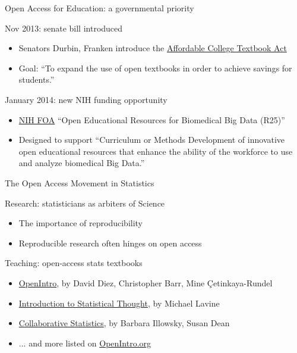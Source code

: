 
\begin{frame}{Open Access for Education: a governmental priority}

\begin{block}{Nov 2013: senate bill introduced}
\begin{itemize}
\item Senators Durbin, Franken introduce the \href{http://thomas.loc.gov/cgi-bin/query/z?c113:S.1704:}{Affordable College Textbook Act}
\item Goal: ``To expand the use of open textbooks in order to achieve savings for students.''
\end{itemize}
\end{block}

\begin{block}{January 2014: new NIH funding opportunity}
\begin{itemize}
\item \href{http://grants.nih.gov/grants/guide/rfa-files/RFA-HG-14-009.html}{NIH FOA} ``Open Educational Resources for Biomedical Big Data (R25)''
\item Designed to support ``Curriculum or Methods Development of innovative open educational resources that enhance the ability of the workforce to use and analyze biomedical Big Data.''
\end{itemize}
\end{block}

\end{frame}




\begin{frame}{The Open Access Movement in Statistics}

\begin{block}{Research: statisticians as arbiters of Science}
\begin{itemize}
\item The importance of reproducibility
\item Reproducible research often hinges on open access
\end{itemize}
\end{block}

\begin{block}{Teaching: open-access stats textbooks}
\begin{itemize}
\item \href{http://www.openintro.org/stat}{OpenIntro}, by David Diez, Christopher Barr, Mine \c{C}etinkaya-Rundel
\item \href{http://www.math.umass.edu/~lavine/Book/book.html}{Introduction to Statistical Thought}, by Michael Lavine
\item \href{http://cnx.org/content/col10522/latest/}{Collaborative Statistics}, by Barbara Illowsky, Susan Dean
\item ... and more listed on \href{http://www.openintro.org/stat/extras.php}{OpenIntro.org}
\end{itemize}
\end{block}

\end{frame}

